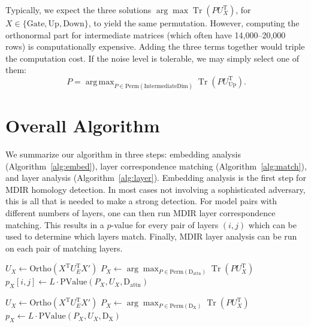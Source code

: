 \documentclass{article} %
\DeclareMathOperator*{\argmax}{arg\,max}
\DeclareMathOperator{\Tr}{Tr}
\begin{document}
Typically, we expect the three solutions $\arg\max \Tr \left( P U_X^{\text{T}} \right)$, for $X \in \{\mathrm{Gate}, \mathrm{Up}, \mathrm{Down}\}$,  
to yield the same permutation. However, computing the orthonormal part for intermediate matrices (which often have 14,000–20,000 rows) is computationally expensive.  
Adding the three terms together would triple the computation cost. If the noise level is tolerable,  
we may simply select one of them:
\[
P = \argmax_{P \in \mathrm{Perm}(\mathrm{IntermediateDim})} \Tr \left( P U_{\mathrm{Up}}^{\text{T}} \right).
\]


\section{Overall Algorithm}
\label{sec:algorithm}

We summarize our algorithm in three steps: embedding analysis (Algorithm~\ref{alg:embed}), layer correspondence matching (Algorithm~\ref{alg:match}), and layer analysis (Algorithm~\ref{alg:layer}). Embedding analysis is the first step for MDIR homology detection. In most cases not involving a sophisticated adversary, this is all that is needed to make a strong detection. For model pairs with different numbers of layers, one can then run MDIR layer correspondence matching. This results in a $p$-value for every pair of layers $(i, j)$ which can be used to determine which layers match. Finally, MDIR layer analysis can be run on each pair of matching layers.




\begin{algorithm}[htbp]
\caption{MDIR layer correspondence matching}
\label{alg:match}
    \begin{algorithmic}[1]
                \State $U_X \gets \mathrm{Ortho}(X^{\text{T}} U_E^{\text{T}} X')$ %
                \State $P_X \gets \arg\max_{P \in \mathrm{Perm}(\mathrm{D_{attn}})} \Tr(P U_X^{\text{T}})$
                \State $p_X[i, j] \gets L \cdot \mathrm{PValue}(P_X, U_X, \mathrm{D_{attn}})$
            \EndFor
        \EndFor
    \EndFor
    \end{algorithmic}
\end{algorithm}

\begin{algorithm}[htbp]
\caption{MDIR layer analysis}
\label{alg:layer}
    \begin{algorithmic}[1]
        \State $U_X \gets \mathrm{Ortho}(X^{\text{T}} U_E^{\text{T}} X')$
        \State $P_X \gets \arg\max_{P \in \mathrm{Perm}(\mathrm{D_X})} \Tr(P U_X^{\text{T}})$
        \State $p_X \gets L \cdot \mathrm{PValue}(P_X, U_X, \mathrm{D_X})$
    \EndFor
    \end{algorithmic}
\end{algorithm}
\end{document}

